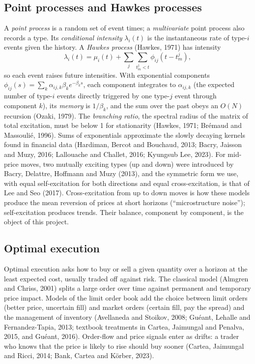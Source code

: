 \documentclass[11pt]{article}
\theoremstyle{definition}
\theoremstyle{remark}
\begin{document}
\subsection{Point processes and Hawkes processes}
\label{sec:bg-hawkes}

A \emph{point process} is a random set of event times; a \emph{multivariate} point process also records a type. Its \emph{conditional intensity} $\lambda_i(t)$ is the instantaneous rate of type-$i$ events given the history. A \emph{Hawkes process} (Hawkes, 1971) has intensity
\[
\lambda_i(t) = \mu_i(t) + \sum_j \sum_{t^j_m < t} \phi_{ij}(t - t^j_m),
\]
so each event raises future intensities. With exponential components $\phi_{ij}(s) = \sum_k \alpha_{ij,k}\beta_k e^{-\beta_k s}$, each component integrates to $\alpha_{ij,k}$ (the expected number of type-$i$ events directly triggered by one type-$j$ event through component $k$), its \emph{memory} is $1/\beta_k$, and the sum over the past obeys an $O(N)$ recursion (Ozaki, 1979). The \emph{branching ratio}, the spectral radius of the matrix of total excitation, must be below 1 for stationarity (Hawkes, 1971; Br\'emaud and Massouli\'e, 1996). Sums of exponentials approximate the slowly decaying kernels found in financial data (Hardiman, Bercot and Bouchaud, 2013; Bacry, Jaisson and Muzy, 2016; Lallouache and Challet, 2016; Kyungsub Lee, 2023). For mid-price moves, two mutually exciting types (up and down) were introduced by Bacry, Delattre, Hoffmann and Muzy (2013), and the symmetric form we use, with equal self-excitation for both directions and equal cross-excitation, is that of Lee and Seo (2017). Cross-excitation from up to down moves is how these models produce the mean reversion of prices at short horizons (``microstructure noise''); self-excitation produces trends. Their balance, component by component, is the object of this project.

\subsection{Optimal execution}
\label{sec:bg-exec}

Optimal execution asks how to buy or sell a given quantity over a horizon at the least expected cost, usually traded off against risk. The classical model (Almgren and Chriss, 2001) splits a large order over time against permanent and temporary price impact. Models of the limit order book add the choice between limit orders (better price, uncertain fill) and market orders (certain fill, pay the spread) and the management of inventory (Avellaneda and Stoikov, 2008; Gu\'eant, Lehalle and Fernandez-Tapia, 2013; textbook treatments in Cartea, Jaimungal and Penalva, 2015, and Gu\'eant, 2016). Order-flow and price signals enter as drifts: a trader who knows that the price is likely to rise should buy sooner (Cartea, Jaimungal and Ricci, 2014; Bank, Cartea and K\"orber, 2023).
\end{document}
